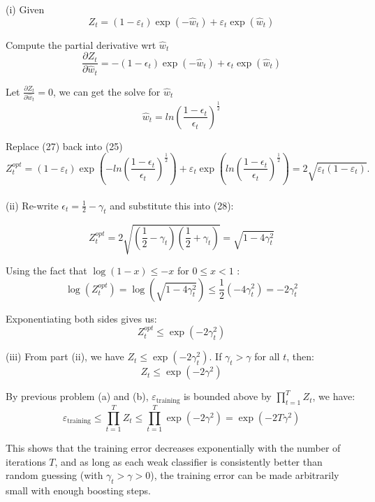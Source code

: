 \begin{answer}

(i)
Given 
\begin{equation}
   Z_t = (1-\varepsilon_t) \exp(-\hat{w}_t) + \varepsilon_t \exp(\hat{w}_t)
\end{equation}

Compute the partial derivative wrt $\hat w_t$ 
\begin{equation}
    \frac{\partial Z_t}{\partial \hat{w}_t} = -(1 - \epsilon_t) \exp(-\hat{w}_t) + \epsilon_t \exp(\hat{w}_t)
\end{equation}

Let $\frac{\partial Z_t}{\partial \hat{w}_t} = 0$, we can get the solve for $\hat{w}_t$
\begin{equation}
    \hat{w}_t = ln(\frac{1 - \epsilon_t}{\epsilon_t})^{\frac{1}{2}} 
\end{equation}

Replace (27) back into (25)
\begin{equation}
    Z_t^{opt} = (1-\varepsilon_t) \exp(-ln(\frac{1 - \epsilon_t}{\epsilon_t})^{\frac{1}{2}} ) + \varepsilon_t \exp(ln(\frac{1 - \epsilon_t}{\epsilon_t})^{\frac{1}{2}} ) = 2 \sqrt{\varepsilon_t (1-\varepsilon_t)}.
\end{equation} \\

(ii)
Re-write $\epsilon_t = \frac{1}{2} - \gamma_t$ and substitute this into 
(28):

\begin{equation}
   Z_t^{opt} = 2\sqrt{\left(\frac{1}{2} - \gamma_t\right)\left(\frac{1}{2} + \gamma_t\right)} = \sqrt{1 - 4\gamma_t^2}
\end{equation}

Using the fact that $\log(1 - x) \leq -x$ for $0 \leq x < 1$ :
\begin{equation}
    \log(Z_t^{opt}) = \log\left(\sqrt{1 - 4\gamma_t^2}\right) \le \frac{1}{2}(-4 \gamma_t^2) = -2\gamma_t^2
\end{equation}


Exponentiating both sides gives us:
\begin{equation}
    Z_t^{opt} \leq \exp(-2\gamma_t^2) 
\end{equation}

(iii)
From part (ii), we have $Z_t \leq \exp(-2\gamma_t^2)$. If $\gamma_t > \gamma$ for all $t$, then:
\begin{equation}
    Z_t \leq \exp(-2\gamma^2)    
\end{equation}


By previous problem (a) and (b), $\varepsilon_{\text{training}}$ is bounded above by $\prod_{t=1}^{T} Z_t$, we have:
\[ \varepsilon_{\text{training}} \leq \prod_{t=1}^{T} Z_t \leq \prod_{t=1}^{T} \exp(-2\gamma^2)  = \exp(-2T \gamma^2) \]

This shows that the training error decreases exponentially with the number of iterations $T$, and as long as each weak classifier is consistently better than random guessing (with $\gamma_t > \gamma > 0$), the training error can be made arbitrarily small with enough boosting steps.

\end{answer}
